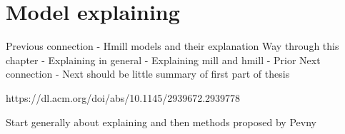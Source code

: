 \chapter{Model explaining}


Previous connection
- Hmill models and their explanation
Way through this chapter
- Explaining in general
- Explaining mill and hmill
- Prior
Next connection
- Next should be little summary of first part of thesis

https://dl.acm.org/doi/abs/10.1145/2939672.2939778


Start generally about explaining and then methods proposed by Pevny